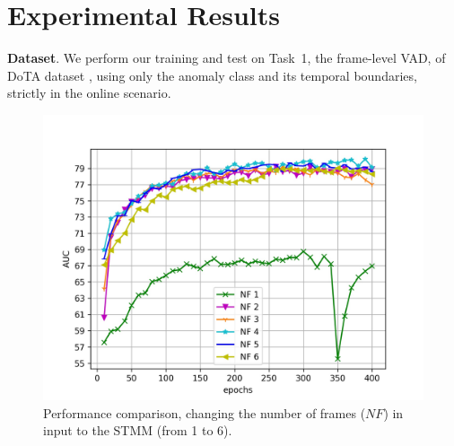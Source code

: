 \section{Experimental Results}
\label{sec:experiments}

\noindent\textbf{Dataset}.
We perform our training and test on Task~1, the frame-level VAD, of DoTA dataset \cite{9712446}, using only the anomaly class and its temporal boundaries, strictly in the online scenario.

\newcommand{\figsize}{0.9\columnwidth}

\begin{figure}[t!]
\centerline{\includegraphics[clip,width=\figsize]{images/exp_1.jpg}}
	\caption{Performance comparison, changing the number of frames ($\mathit{NF}$) in input to the STMM (from 1 to 6).}
	\label{fig:num-frames-vst}
\end{figure}


